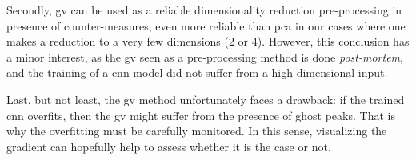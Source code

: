 Secondly, \gls{gv} can be used as a reliable dimensionality reduction pre-processing in presence of counter-measures, even more reliable than \gls{pca} in our cases where one makes a reduction to a very few dimensions (2 or 4).
However, this conclusion has a minor interest, as the \gls{gv} seen as a pre-processing method is done \textit{post-mortem}, and the training of a \gls{cnn} model did not suffer from a high dimensional input.

Last, but not least, the \gls{gv} method unfortunately faces a drawback: if the trained \gls{cnn} overfits, then the \gls{gv} might suffer from the presence of ghost peaks.
That is why the overfitting must be carefully monitored.
In this sense, visualizing the gradient can hopefully help to assess whether it is the case or not.